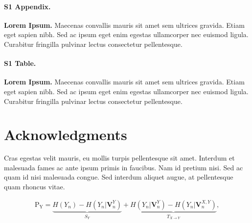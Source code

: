 \documentclass[10pt,letterpaper]{article}
\begin{document}
\paragraph*{S1 Appendix.}
\label{S1_Appendix}
{\bf Lorem Ipsum.} Maecenas convallis mauris sit amet sem ultrices gravida. Etiam eget sapien nibh. Sed ac ipsum eget enim egestas ullamcorper nec euismod ligula. Curabitur fringilla pulvinar lectus consectetur pellentesque.

\paragraph*{S1 Table.}
\label{S1_Table}
{\bf Lorem Ipsum.} Maecenas convallis mauris sit amet sem ultrices gravida. Etiam eget sapien nibh. Sed ac ipsum eget enim egestas ullamcorper nec euismod ligula. Curabitur fringilla pulvinar lectus consectetur pellentesque.

\section*{Acknowledgments}
Cras egestas velit mauris, eu mollis turpis pellentesque sit amet. Interdum et malesuada fames ac ante ipsum primis in faucibus. Nam id pretium nisi. Sed ac quam id nisi malesuada congue. Sed interdum aliquet augue, at pellentesque quam rhoncus vitae.

\begin{eqnarray}
\label{eq:schemeP} 
	\mathrm{P_Y} = \underbrace{H(Y_n) - H(Y_n|\mathbf{V}^{Y}_{n})}_{S_Y} + \underbrace{H(Y_n|\mathbf{V}^{Y}_{n})- H(Y_n|\mathbf{V}^{X,Y}_{n})}_{T_{X\rightarrow Y}},
\end{eqnarray}

\nolinenumbers
\end{document}
